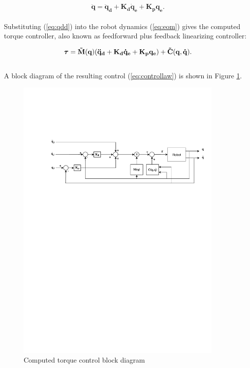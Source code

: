 \begin{equation}\label{eq:qdd}
    \mathbf{\ddot{q} = \ddot{q}_d + K_d \dot{q}_e + K_p q_e}.
\end{equation}
\\
Substituting (\ref{eq:qdd}) into the robot dynamics (\ref{eq:eom}) gives the computed torque controller, also known as feedforward plus feedback linearizing controller:

\begin{equation}\label{eq:controllaw}
    \boldsymbol{\tau} = \mathbf{\Tilde{M}(q) (\ddot{q}_d + K_d \dot{q}_e + K_p q_e) + \Tilde{C}(q,\dot{q})}.
\end{equation}
\\
A block diagram of the resulting control (\ref{eq:controllaw}) is shown in Figure \ref{fig:block-diag-torque}.

\begin{figure}
    \centering
    \includegraphics[trim=3cm 19cm 0.5cm 5cm, clip=true, width=0.9\textwidth]{figures/blockdiag.pdf}
    \caption{Computed torque control block diagram}
    \label{fig:block-diag-torque}
\end{figure}


